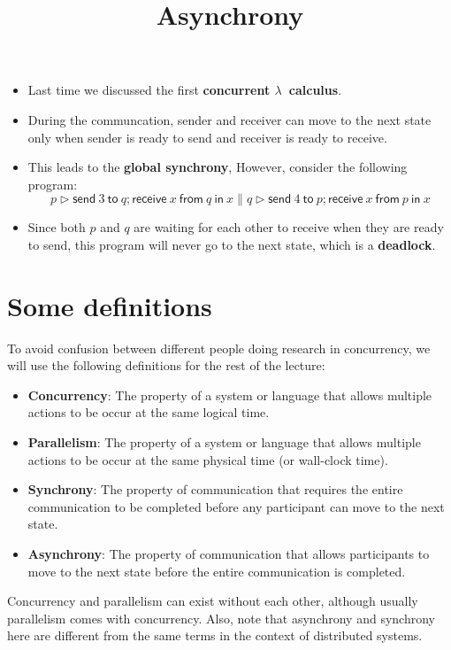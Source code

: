 \documentclass{lecturenotes}
\title{Asynchrony}
\newcommand{\send}[2]{\ensuremath{\textsf{send}\ #1\ \textsf{to}\ #2}}
\newcommand{\recv}[3]{\ensuremath{\textsf{receive}\ #1\ \textsf{from}\ #2\ \textsf{in}\ #3}}
\begin{document}
\maketitle

\begin{itemize}
\item Last time we discussed the first \textbf{concurrent $\lambda$~calculus}.
\item During the communcation, sender and receiver can move to the next state
      only when sender is ready to send and receiver is ready to receive.
\item This leads to the \textbf{global synchrony}, However, consider the following program:
      \[
        p \triangleright \send{3}{q}; \recv{x}{q}{x} \parallel q \triangleright \send{4}{p}; \recv{x}{p}{x}
      \]
\item Since both $p$ and $q$ are waiting for each other to receive when they are ready to send,
      this program will never go to the next state, which is a \textbf{deadlock}.
\end{itemize}

\section{Some definitions}\label{sec:asyn-defs}
To avoid confusion between different people doing research in concurrency,
we will use the following definitions for the rest of the lecture:
\begin{itemize}
\item \textbf{Concurrency}: The property of a system or language that allows multiple
      actions to be occur at the same logical time.
\item \textbf{Parallelism}: The property of a system or language that allows multiple
      actions to be occur at the same physical time (or wall-clock time).
\item \textbf{Synchrony}: The property of communication that requires the entire communication
      to be completed before any participant can move to the next state.
\item \textbf{Asynchrony}: The property of communication that allows participants to
      move to the next state before the entire communication is completed.
\end{itemize}
Concurrency and parallelism can exist without each other,
although usually parallelism comes with concurrency.
Also, note that asynchrony and synchrony here are different from
the same terms in the context of distributed systems.
\end{document}
